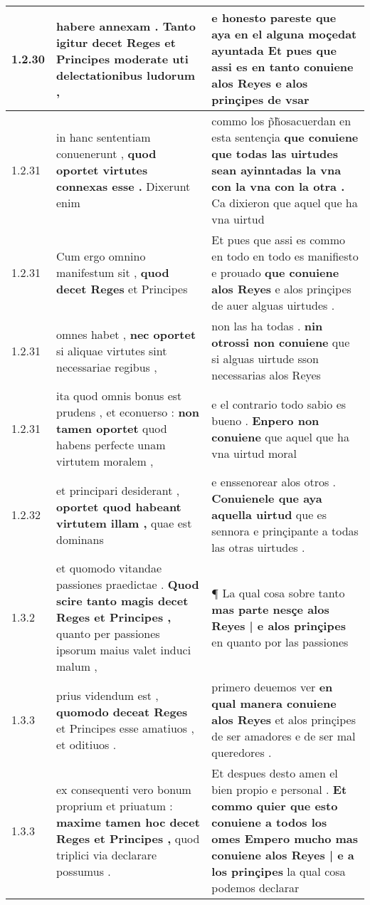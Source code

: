 \begin{tabular}{|p{1cm}|p{6.5cm}|p{6.5cm}|}
1.2.30 & habere annexam . \textbf{ Tanto igitur decet Reges et Principes moderate } uti delectationibus ludorum , & e honesto pareste \textbf{ que aya en el alguna moçedat ayuntada Et pues que assi es en tanto conuiene alos Reyes } e alos prinçipes de vsar \\\hline
1.2.31 & in hanc sententiam conuenerunt , \textbf{ quod oportet virtutes connexas esse . } Dixerunt enim & commo los p̃h̃osacuerdan en esta sentençia \textbf{ que conuiene que todas las uirtudes sean ayinntadas la vna con la vna con la otra . } Ca dixieron que aquel que ha vna uirtud \\\hline
1.2.31 & Cum ergo omnino manifestum sit , \textbf{ quod decet Reges } et Principes & Et pues que assi es commo en todo en todo es manifiesto e prouado \textbf{ que conuiene alos Reyes } e alos prinçipes de auer alguas uirtudes . \\\hline
1.2.31 & omnes habet , \textbf{ nec oportet } si aliquae virtutes sint necessariae regibus , & non las ha todas . \textbf{ nin otrossi non conuiene } que si alguas uirtude sson necessarias alos Reyes \\\hline
1.2.31 & ita quod omnis bonus est prudens , et econuerso : \textbf{ non tamen oportet } quod habens perfecte unam virtutem moralem , & e el contrario todo sabio es bueno . \textbf{ Enpero non conuiene } que aquel que ha vna uirtud moral \\\hline
1.2.32 & et principari desiderant , \textbf{ oportet quod habeant virtutem illam , } quae est dominans & e enssenorear alos otros . \textbf{ Conuienele que aya aquella uirtud } que es sennora e prinçipante a todas las otras uirtudes . \\\hline
1.3.2 & et quomodo vitandae passiones praedictae . \textbf{ Quod scire tanto magis decet Reges et Principes , } quanto per passiones ipsorum maius valet induci malum , & ¶ La qual cosa sobre tanto \textbf{ mas parte nesçe alos Reyes | e alos prinçipes } en quanto por las passiones \\\hline
1.3.3 & prius videndum est , \textbf{ quomodo deceat Reges } et Principes esse amatiuos , et oditiuos . & primero deuemos ver \textbf{ en qual manera conuiene alos Reyes } et alos prinçipes de ser amadores e de ser mal queredores . \\\hline
1.3.3 & ex consequenti vero bonum proprium et priuatum : \textbf{ maxime tamen hoc decet Reges et Principes , } quod triplici via declarare possumus . & Et despues desto amen el bien propio e personal . \textbf{ Et commo quier que esto conuiene a todos los omes Empero mucho mas conuiene alos Reyes | e a los prinçipes } la qual cosa podemos declarar \\\hline

\end{tabular}

